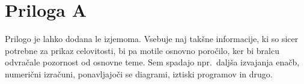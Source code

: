 
\chapter{Priloga A}\label{cha:priloga}
Prilogo je lahko dodana le izjemoma. Vsebuje naj takšne informacije, ki so sicer potrebne za prikaz celovitosti, bi pa motile osnovno poročilo, ker bi bralcu odvračale pozornost od osnovne teme. Sem spadajo npr.\ daljša izvajanja enačb, numerični izračuni, ponavljajoči se diagrami, iztiski programov in drugo.